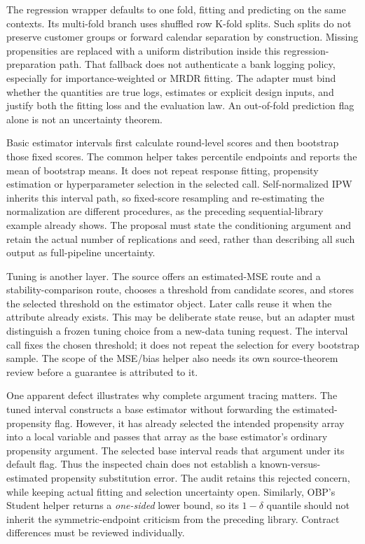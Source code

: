 The regression wrapper defaults to one fold, fitting and predicting on the
same contexts. Its multi-fold branch uses shuffled row K-fold splits. Such
splits do not preserve customer groups or forward calendar separation by
construction. Missing propensities are replaced with a uniform distribution
inside this regression-preparation path. That fallback does not authenticate a
bank logging policy, especially for importance-weighted or MRDR fitting. The
adapter must bind whether the quantities are true logs, estimates or explicit
design inputs, and justify both the fitting loss and the evaluation law. An
out-of-fold prediction flag alone is not an uncertainty theorem.
\cite{exec23_obp_sources}

Basic estimator intervals first calculate round-level scores and then bootstrap
those fixed scores. The common helper takes percentile endpoints and reports
the mean of bootstrap means. It does not repeat response fitting, propensity
estimation or hyperparameter selection in the selected call. Self-normalized
IPW inherits this interval path, so fixed-score resampling and re-estimating the
normalization are different procedures, as the preceding sequential-library
example already shows. The proposal must state the conditioning argument and
retain the actual number of replications and seed, rather than describing all
such output as full-pipeline uncertainty.
\cite{exec23_obp_sources}

Tuning is another layer. The source offers an estimated-MSE route and a
stability-comparison route, chooses a threshold from candidate scores, and
stores the selected threshold on the estimator object. Later calls reuse it
when the attribute already exists. This may be deliberate state reuse, but an
adapter must distinguish a frozen tuning choice from a new-data tuning request.
The interval call fixes the chosen threshold; it does not repeat the selection
for every bootstrap sample. The scope of the MSE/bias helper also needs its own
source-theorem review before a guarantee is attributed to it.
\cite{exec23_obp_sources}

One apparent defect illustrates why complete argument tracing matters. The
tuned interval constructs a base estimator without forwarding the estimated-
propensity flag. However, it has already selected the intended propensity
array into a local variable and passes that array as the base estimator's
ordinary propensity argument. The selected base interval reads that argument
under its default flag. Thus the inspected chain does not establish a
known-versus-estimated propensity substitution error. The audit retains this
rejected concern, while keeping actual fitting and selection uncertainty open.
Similarly, OBP's Student helper returns a \emph{one-sided} lower bound, so its
$1-\delta$ quantile should not inherit the symmetric-endpoint criticism from
the preceding library. Contract differences must be reviewed individually.
\cite{exec23_obp_sources,exec23_obp_reference}

